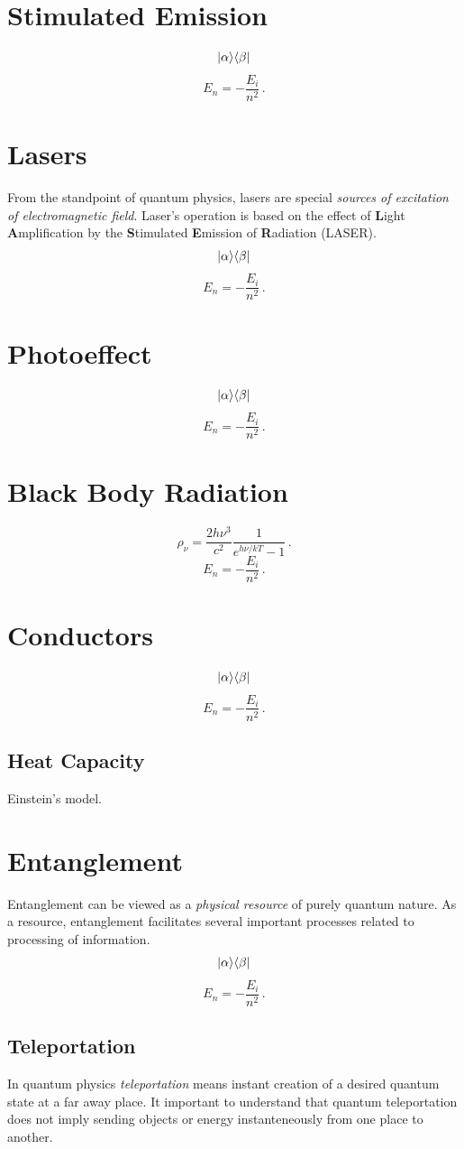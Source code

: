 \section{Stimulated Emission}
\[
|{\alpha}\rangle\langle{\beta}|
\]
\[
E_n = -\frac{E_i}{n^2}\,.
\]

\section{Lasers}
From the standpoint of quantum physics, lasers are special \emph{sources of excitation of electromagnetic field}. Laser's operation is based on the effect of {\bf L}ight {\bf A}mplification by the {\bf S}timulated {\bf E}mission of {\bf R}adiation (LASER).
\[
|{\alpha}\rangle\langle{\beta}|
\]
\[
E_n = -\frac{E_i}{n^2}\,.
\]



\section{Photoeffect}
\[
|{\alpha}\rangle\langle{\beta}|
\]
\[
E_n = -\frac{E_i}{n^2}\,.
\]

\section{Black Body Radiation}
\[
\rho_\nu = \frac{2h\nu^3}{c^2}\frac{1}{e^{h\nu/kT}-1}\,.
\]
\[
E_n = -\frac{E_i}{n^2}\,.
\]

\section{Conductors}
\[
|{\alpha}\rangle\langle{\beta}|
\]
\[
E_n = -\frac{E_i}{n^2}\,.
\]

\subsection{Heat Capacity}
Einstein's model.

\section{Entanglement}
Entanglement can be viewed as a \emph{physical resource} of purely quantum nature. As a resource, entanglement facilitates several important processes related to processing of information.
\[
|{\alpha}\rangle\langle{\beta}|
\]
\[
E_n = -\frac{E_i}{n^2}\,.
\]
\subsection{Teleportation}
In quantum physics \emph{teleportation} means instant creation of a desired quantum state at a far away place. It important to understand that quantum teleportation does not imply sending objects or energy instanteneously from one place to another.

